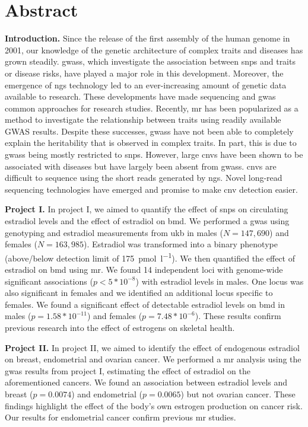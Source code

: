 \documentclass[twoside=false]{scrbook}
\begin{document}
\chapter{Abstract}
\textbf{Introduction.}
Since the release of the first assembly of the human genome in 2001, our knowledge of the genetic architecture of complex traits and diseases has grown steadily.
\Glspl{gwas}, which investigate the association between \glspl{snp} and traits or disease risks, have played a major role in this development.
Moreover, the emergence of \gls{ngs} technology led to an ever-increasing amount of genetic data available to research.
These developments have made sequencing and \gls{gwas} common approaches for research studies.
Recently, \gls{mr} has been popularized as a method to investigate the relationship between traits using readily available GWAS results.
Despite these successes, \glspl{gwas} have not been able to completely explain the heritability that is observed in complex traits.
In part, this is due to \glspl{gwas} being mostly restricted to \glspl{snp}.
However, large \glspl{cnv} have been shown to be associated with diseases but have largely been absent from \glspl{gwas}.
\Glspl{cnv} are difficult to sequence using the short reads generated by \gls{ngs}.
Novel long-read sequencing technologies have emerged and promise to make \gls{cnv} detection easier.

\textbf{Project I.}
In project I, we aimed to quantify the effect of \glspl{snp} on circulating estradiol levels and the effect of estradiol on \gls{bmd}.
We performed a \gls{gwas} using genotyping and estradiol measurements from \gls{ukb} in males ($N = 147,690$) and females ($N = 163,985$).
Estradiol was transformed into a binary phenotype (above/below detection limit of \qty{175}{\pmol\per\l}).
We then quantified the effect of estradiol on \gls{bmd} using \gls{mr}.
We found 14 independent loci with genome-wide significant associations ($p < 5* 10^{-8}$) with estradiol levels in males.
One locus was also significant in females and we identified an additional locus specific to females. We found a significant effect of detectable estradiol levels on \gls{bmd} in males ($p=1.58 * 10^{-11}$) and females ($p=7.48*10^{-6}$).
These results confirm previous research into the effect of estrogens on skeletal health.

\textbf{Project II.}
In project II, we aimed to identify the effect of endogenous estradiol on breast, endometrial and ovarian cancer.
We performed a \gls{mr} analysis using the \gls{gwas} results from project I, estimating the effect of estradiol on the aforementioned cancers.
We found an association between estradiol levels and breast ($p= 0.0074$) and endometrial ($p = 0.0065$) but not ovarian cancer.
These findings highlight the effect of the body’s own estrogen production on cancer risk. Our results for endometrial cancer confirm previous \gls{mr} studies.
\end{document}
